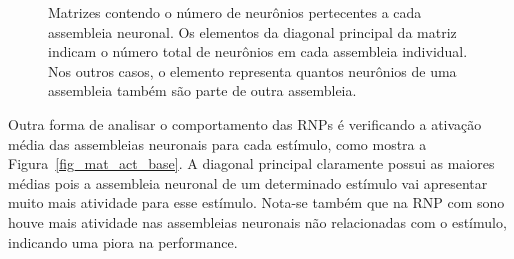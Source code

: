 \begin{figure}[!ht]
\caption{Matrizes contendo o número de neurônios pertecentes a cada assembleia neuronal. Os elementos da diagonal principal da
matriz indicam o número total de neurônios em cada assembleia individual. Nos outros casos, o elemento representa quantos
neurônios de uma assembleia também são parte de outra assembleia.}

\end{figure}

Outra forma de analisar o comportamento das RNPs é verificando a ativação média das assembleias neuronais para cada estímulo, como
mostra a Figura~\ref{fig_mat_act_base}. A diagonal principal claramente possui as maiores médias pois a assembleia neuronal de um
determinado estímulo vai apresentar muito mais atividade para esse estímulo. Nota-se também que na RNP com sono houve mais
atividade nas assembleias neuronais não relacionadas com o estímulo, indicando uma piora na performance.


